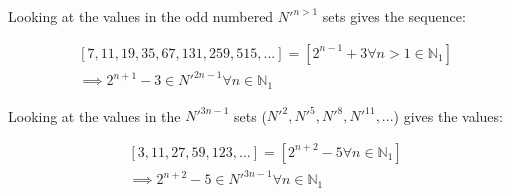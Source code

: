 \documentclass{article}
\begin{document}
\noindent
Looking at the values in the odd numbered \begin{math}N'^{n>1}\end{math} sets
gives the sequence:

\begin{displaymath}\begin{aligned}
& [7, 11, 19, 35, 67, 131, 259, 515, ...] = [2^{n-1}+3 \forall n>1 \in \mathbb{N}_{1}] \\
& \implies 2^{n+1}-3 \in N'^{2n-1} \forall n \in \mathbb{N}_{1}
\end{aligned}\end{displaymath}

\noindent
Looking at the values in the \begin{math}N'^{3n-1}\end{math} sets
(\begin{math}N'^{2}, N'^{5}, N'^{8}, N'^{11}, ...\end{math}) gives the values:

\begin{displaymath}\begin{aligned}
& [3, 11, 27, 59, 123, ...] = [2^{n+2}-5 \forall n \in \mathbb{N}_{1}] \\
& \implies 2^{n+2}-5 \in N'^{3n-1} \forall n \in \mathbb{N}_{1}
\end{aligned}\end{displaymath}
\end{document}
